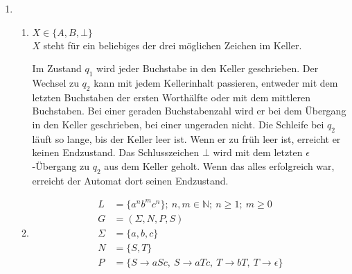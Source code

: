 \documentclass[a4paper]{scrartcl}
\title{\titleinfo}
\author{Arne Feil}
\date{\today}
\newcommand{\aufgabe}[1]{\item[\textbf{#1}]}
\begin{document}
\begin{enumerate}

\aufgabe{4.3}
\begin{enumerate}[1.]
 \item
 $X \in \{A,B,\bot\}$\\
 $X$ steht für ein beliebiges der drei möglichen Zeichen im Keller.\\

Im Zustand $q_1$ wird jeder Buchstabe in den Keller geschrieben.
Der Wechsel zu $q_2$ kann mit jedem Kellerinhalt passieren, entweder mit dem letzten Buchstaben der ersten Worthälfte oder mit dem mittleren Buchstaben.
Bei einer geraden Buchstabenzahl wird er bei dem Übergang in den Keller geschrieben, bei einer ungeraden nicht.
Die Schleife bei $q_2$ läuft so lange, bis der Keller leer ist. Wenn er zu früh leer ist, erreicht er keinen Endzustand.
Das Schlusszeichen $\bot$ wird mit dem letzten $\epsilon$-Übergang zu $q_2$ aus dem Keller geholt. Wenn das alles erfolgreich war, erreicht der Automat dort seinen Endzustand.

\item
\begin{align*}
 L &= \{a^n b^m c^n\};\ n,m\in\mathbb{N};\ n\geq 1;\ m\geq 0\\
 G &= (\Sigma,N,P,S)\\
 \Sigma &= \{a,b,c\}\\ %
 N &= \{S,T\}\\
 P &= \{
   S\to aSc,\
   S\to aTc,\
   T\to bT,\
   T\to \epsilon
 \}
\end{align*}


\end{enumerate}
\end{enumerate}
\end{document}
